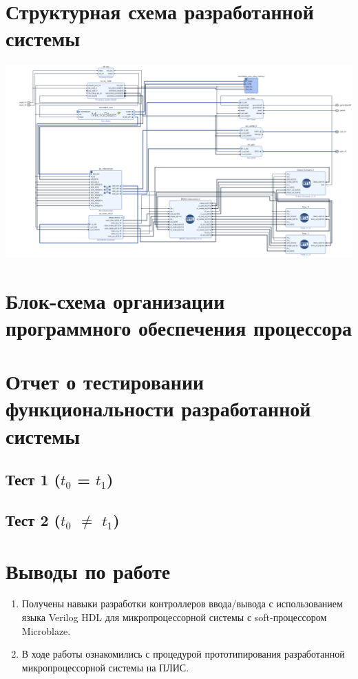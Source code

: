 \documentclass[a4paper, 12pt]{article}
\begin{document}
\section{Структурная схема разработанной системы}
\includegraphics[width=\textwidth]{scheme.png}

\section{Блок-схема организации программного обеспечения процессора}

\section{Отчет о тестировании функциональности разработанной системы}
\subsection{Тест 1 ($t_{0}$ = $t_{1}$)}
\subsection{Тест 2 ($t_{0}$ $\neq$ $t_{1}$)}

\section{Выводы по работе}
\begin{enumerate}
\item Получены навыки разработки контроллеров ввода/вывода с использованием языка Verilog HDL для микропроцессорной системы с soft-процессором Microblaze.
\item В ходе работы ознакомились с процедурой прототипирования разработанной микропроцессорной системы на ПЛИС.
\end{enumerate}
\end{document}
